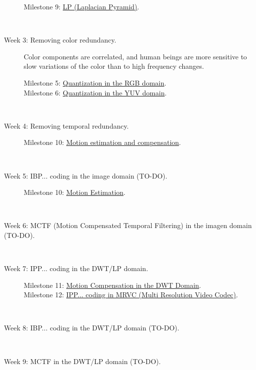 \begin{description}
\begin{description}
  \item [Milestone 9: {\normalfont \href{}{LP (Laplacian Pyramid)}.}]
  \end{description}
  ~\newline
\item [Week 3: {\normalfont Removing color redundancy.}] Color components are correlated, and human beings are more sensitive to slow variations of the color than to high frequency changes.
  \begin{description}
  \item [Milestone 5: {\normalfont \href{https://sistemas-multimedia.github.io/milestones/05-RGB_quantization/}{Quantization in the RGB domain}.}]
  \item [Milestone 6: {\normalfont \href{https://sistemas-multimedia.github.io/milestones/06-YUV_quantization/}{Quantization in the YUV domain}.}] %
  \end{description}
  ~\newline
\item [Week 4: {\normalfont Removing temporal redundancy.}]
  \begin{description}
  \item [Milestone 10: {\normalfont \href{https://sistemas-multimedia.github.io/milestones/10-ME/}{Motion estimation and compensation}.}]
  \end{description}
  ~\newline
\item [Week 5: {\normalfont IBP... coding in the image domain (TO-DO).}]
  \begin{description}
  \item [Milestone 10: {\normalfont \href{https://sistemas-multimedia.github.io/milestones/10-ME/}{Motion Estimation}.}] %
  \end{description}
  ~\newline
\item [Week 6: {\normalfont MCTF (Motion Compensated Temporal Filtering) in the imagen domain (TO-DO).}]
  ~\newline
\item [Week 7: {\normalfont IPP... coding in the DWT/LP domain.}]
  \begin{description}
  \item [Milestone 11: {\normalfont \href{https://sistemas-multimedia.github.io/milestones/11-MC_in_DWT_domain/}{Motion Compensation in the DWT Domain}.}]
  \item [Milestone 12: {\normalfont \href{https://sistemas-multimedia.github.io/milestones/12-IPP_coding/}{IPP... coding in MRVC (Multi Resolution Video Codec)}.}]
  \end{description}
  ~\newline
\item [Week 8: {\normalfont IBP... coding in the DWT/LP domain (TO-DO).}]
  ~\newline
\item [Week 9: {\normalfont MCTF in the DWT/LP domain (TO-DO).}]
\end{description}

